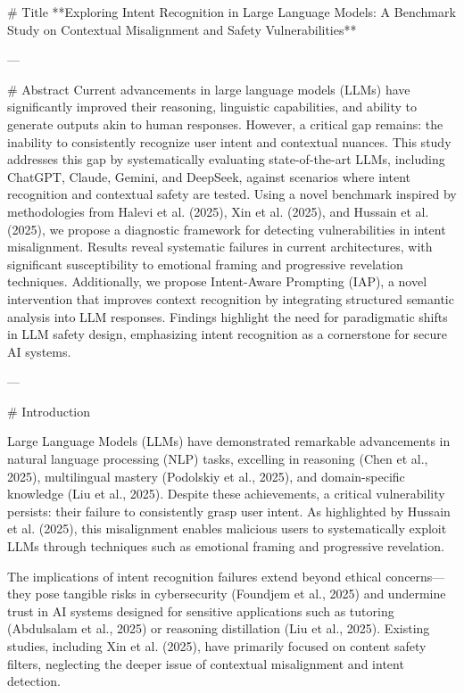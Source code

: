 # Title  
**Exploring Intent Recognition in Large Language Models: A Benchmark Study on Contextual Misalignment and Safety Vulnerabilities**

---

# Abstract  
Current advancements in large language models (LLMs) have significantly improved their reasoning, linguistic capabilities, and ability to generate outputs akin to human responses. However, a critical gap remains: the inability to consistently recognize user intent and contextual nuances. This study addresses this gap by systematically evaluating state-of-the-art LLMs, including ChatGPT, Claude, Gemini, and DeepSeek, against scenarios where intent recognition and contextual safety are tested. Using a novel benchmark inspired by methodologies from Halevi et al. (2025), Xin et al. (2025), and Hussain et al. (2025), we propose a diagnostic framework for detecting vulnerabilities in intent misalignment. Results reveal systematic failures in current architectures, with significant susceptibility to emotional framing and progressive revelation techniques. Additionally, we propose Intent-Aware Prompting (IAP), a novel intervention that improves context recognition by integrating structured semantic analysis into LLM responses. Findings highlight the need for paradigmatic shifts in LLM safety design, emphasizing intent recognition as a cornerstone for secure AI systems.  

---

# Introduction  

Large Language Models (LLMs) have demonstrated remarkable advancements in natural language processing (NLP) tasks, excelling in reasoning (Chen et al., 2025), multilingual mastery (Podolskiy et al., 2025), and domain-specific knowledge (Liu et al., 2025). Despite these achievements, a critical vulnerability persists: their failure to consistently grasp user intent. As highlighted by Hussain et al. (2025), this misalignment enables malicious users to systematically exploit LLMs through techniques such as emotional framing and progressive revelation.  

The implications of intent recognition failures extend beyond ethical concerns—they pose tangible risks in cybersecurity (Foundjem et al., 2025) and undermine trust in AI systems designed for sensitive applications such as tutoring (Abdulsalam et al., 2025) or reasoning distillation (Liu et al., 2025). Existing studies, including Xin et al. (2025), have primarily focused on content safety filters, neglecting the deeper issue of contextual misalignment and intent detection.  

